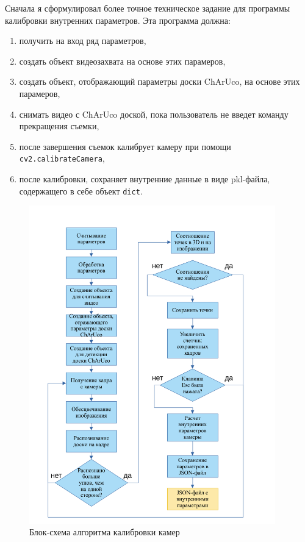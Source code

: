 \documentclass[12pt, a4paper]{article}
\begin{document}
Сначала я сформулировал более точное техническое задание для программы калибровки внутренних параметров. 
Эта программа должна:
\begin{enumerate}
  \item получить на вход ряд параметров,
  \item создать объект видеозахвата на основе этих парамеров,
  \item создать объект, отображающий параметры доски ChArUco, на основе этих парамеров,
  \item снимать видео с ChArUco доской, пока пользователь не введет команду прекращения съемки,
  \item после завершения съемок калибрует камеру при помощи \texttt{cv2.calibrateCamera},
  \item после калибровки, сохраняет внутренние данные в виде pkl-файла, содержащего в себе объект \texttt{dict}.
\end{enumerate}

\begin{figure}[h!]
  \begin{center}
    \includegraphics[width=0.95\textwidth]{images/block-schemes/intrinsics_scheme.png}
  \end{center}
  \caption{Блок-схема алгоритма калибровки камер}
  \label{fig:intrinsincs_block_scheme}
\end{figure}
\end{document}
